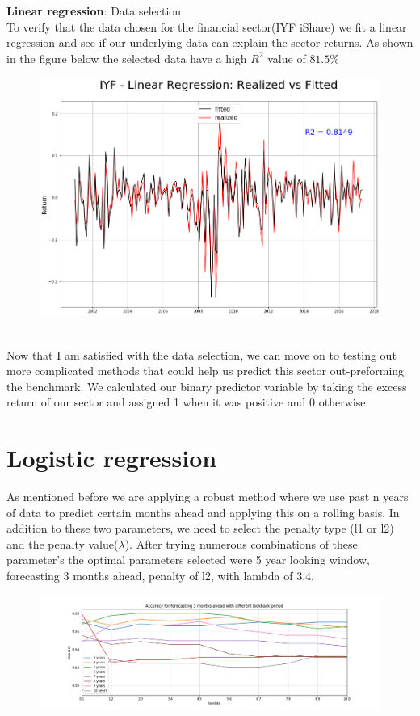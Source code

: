 \documentclass[12pt]{amsart}
\begin{document}
\vskip 8pt \noindent
{\textbf{Linear regression}: }
\vskip 8pt \noindent
Data selection  
\\
To verify that the data chosen for the financial sector(IYF iShare) we fit a linear regression and see if our underlying data can explain the sector returns. As shown in the figure below the selected data have a high $R^2$ value of $81.5 \%$
\begin{figure}[htb]
	\includegraphics[scale=0.5]{linear_regression_additional_data.png}
\end{figure}
\\
Now that I am satisfied with the data selection, we can move on to testing out more complicated methods that could help us predict this sector out-preforming the benchmark. We calculated our binary predictor variable by taking the excess return of our sector and assigned 1 when it was positive and 0 otherwise.
\\
\section*{Logistic regression}
As mentioned before we are applying a robust method where we use past n years of data to predict certain months ahead and applying this on a rolling basis. In addition to these two parameters, we need to select the penalty type (l1 or l2) and the penalty value($\lambda$). After trying numerous combinations of these parameter's the optimal parameters selected were 5 year looking window, forecasting 3 months ahead, penalty of l2, with lambda of 3.4. 
\begin{figure}[htb]
	\includegraphics[scale=0.45]{logistic_acf_3month_result.png}
\end{figure}
\end{document}
